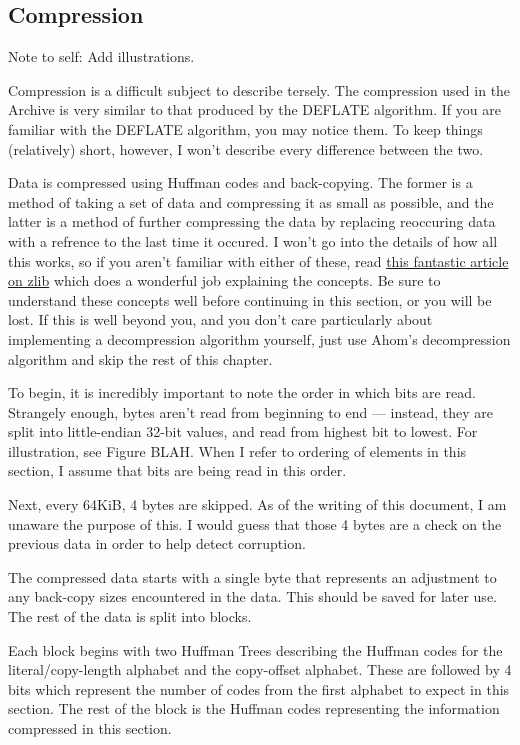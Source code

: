 \subsection{Compression}
\label{subsec:compression}

Note to self: Add illustrations.

Compression is a difficult subject to describe tersely.  The compression used in
the Archive is very similar to that produced by the DEFLATE algorithm.  If you
are familiar with the DEFLATE algorithm, you may notice them.  To keep things
(relatively) short, however, I won't describe every difference between the two.

Data is compressed using Huffman codes and back-copying.  The former is a method
of taking a set of data and compressing it as small as possible, and the latter
is a method of further compressing the data by replacing reoccuring data with a
refrence to the last time it occured.  I won't go into the details of how all
this works, so if you aren't familiar with either of these, read
\href{http://zlib.net/feldspar.html}{this fantastic article on zlib} which does
a wonderful job explaining the concepts.  Be sure to understand these concepts
well before continuing in this section, or you will be lost.  If this is well
beyond you, and you don't care particularly about implementing a decompression
algorithm yourself, just use Ahom's decompression algorithm and skip the rest
of this chapter.

To begin, it is incredibly important to note the order in which bits are read.
Strangely enough, bytes aren't read from beginning to end --- instead, they
are split into little-endian 32-bit values, and read from highest bit to lowest.
For illustration, see Figure BLAH.  When I refer to ordering of elements in this
section, I assume that bits are being read in this order.

Next, every 64KiB, 4 bytes are skipped.  As of the writing of this document, I
am unaware the purpose of this.  I would guess that those 4 bytes are a check
on the previous data in order to help detect corruption.

The compressed data starts with a single byte that represents an adjustment to
any back-copy sizes encountered in the data.  This should be saved for later
use.  The rest of the data is split into blocks.

Each block begins with two Huffman Trees describing the Huffman codes for the
literal/copy-length alphabet and the copy-offset alphabet. These are followed
by 4 bits which represent the number of codes from the first alphabet to expect
in this section. The rest of the block is the Huffman codes representing the
information compressed in this section.

